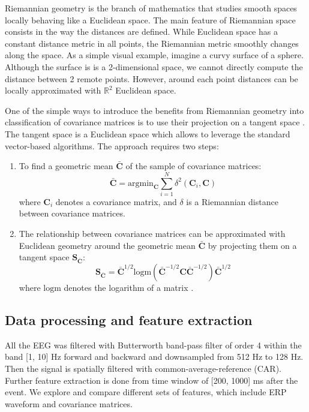 \documentclass[12pt]{iopart}
\begin{document}
Riemannian geometry is the branch of mathematics that studies
smooth spaces locally behaving like a Euclidean space.
The main feature of Riemannian space consists in the way the distances are defined.
While Euclidean space has a constant distance metric in all points,
the Riemannian metric smoothly changes along the space.
As a simple visual example, imagine a curvy surface of a sphere.
Although the surface is is a 2-dimensional space,
we cannot directly compute the distance between 2 remote points.
However, around each point distances can be locally approximated
with $\mathbb{R}^2$ Euclidean space.

One of the simple ways to introduce the benefits from Riemannian geometry
into classification of covariance matrices is to use their projection
on a tangent space \cite{barachant_multiclass_2012}. The tangent space is a Euclidean space which allows
to leverage the standard vector-based algorithms.
The approach requires two steps:
\begin{enumerate}
    \item To find a geometric mean $\bar{\mathbf{C}}$ of the sample of covariance matrices:
        \begin{equation}
            \bar{\mathbf{C}} = \textrm{argmin}_\mathbf{C} \sum_{i=1}^N \delta^2 (\mathbf{C}_i, \mathbf{C})
            \label{eq:geommean}
        \end{equation}
        where $\mathbf{C}_i$ denotes a covariance matrix, and $\delta$ is a 
        Riemannian distance between covariance matrices.
    \item The relationship between covariance matrices can be approximated with
        Euclidean geometry around the geometric mean $\bar{\mathbf{C}}$ by projecting them on a tangent
        space $\mathbf{S}_{\bar{\mathbf{C}}}$:
        \begin{equation}
            \mathbf{S}_{\bar{\mathbf{C}}} = \bar{\mathbf{C}}^{1/2}
            \textrm{logm}(\bar{\mathbf{C}}^{-1/2}\mathbf{C}\bar{\mathbf{C}}^{-1/2})\bar{\mathbf{C}}^{1/2}
            \label{eq:logm}
        \end{equation}
        where $\textrm{logm}$ denotes the logarithm of a matrix \cite{berger_panoramic_2003}.
\end{enumerate}

\subsection{Data processing and feature extraction}
All the EEG was filtered with Butterworth band-pass filter of order 4 within the band [1, 10] Hz
forward and backward and downsampled from 512 Hz to 128 Hz. Then the signal is spatially
filtered with common-average-reference (CAR). Further feature extraction is done
from time window of [200, 1000] ms after the event. We explore and compare different sets
of features, which include ERP waveform and covariance matrices.
\end{document}
